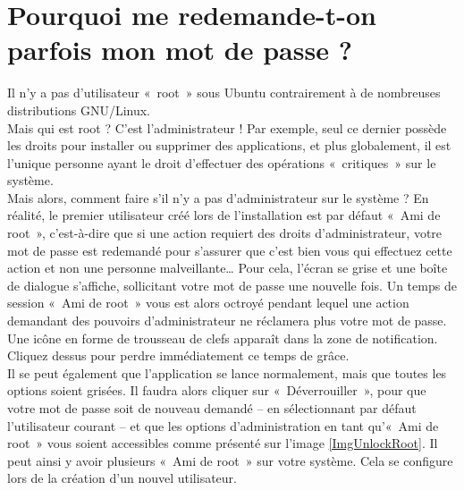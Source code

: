 \section{Pourquoi me redemande-t-on parfois mon mot de passe ?}
\label{RefMdpRoot}
Il n'y a pas d'utilisateur «~root~» sous Ubuntu contrairement à de nombreuses distributions GNU/Linux.\\
Mais qui est root ? C'est l'administrateur ! Par exemple, seul ce dernier possède les droits pour installer ou supprimer des applications, et plus globalement, il est l'unique personne ayant le droit d'effectuer des opérations «~critiques~» sur le système.\\
Mais alors, comment faire s'il n'y a pas d'administrateur sur le système ? En réalité, le premier utilisateur créé lors de l'installation est par défaut «~Ami de root~», c'est-à-dire que si une action requiert des droits d'administrateur, votre mot de passe est redemandé pour s'assurer que c'est bien vous qui effectuez cette action et non une personne malveillante\ldots{} Pour cela, l'écran se grise et une boîte de dialogue s'affiche, sollicitant votre mot de passe une nouvelle fois. Un temps de session «~Ami de root~» vous est alors octroyé pendant lequel une action demandant des pouvoirs d'administrateur ne réclamera plus votre mot de passe. Une icône en forme de trousseau de clefs apparaît dans la zone de notification. Cliquez dessus pour perdre immédiatement ce temps de grâce.\\
Il se peut également que l'application se lance normalement, mais que toutes les options soient grisées. Il faudra alors cliquer sur «~Déverrouiller~», pour que votre mot de passe soit de nouveau demandé -- en sélectionnant par défaut l'utilisateur courant -- et que les options d'administration en tant qu'«~Ami de root~» vous soient accessibles comme présenté sur l'image \ref{ImgUnlockRoot}. Il peut ainsi y avoir plusieurs «~Ami de root~» sur votre système. Cela se configure lors de la création d'un nouvel utilisateur.
